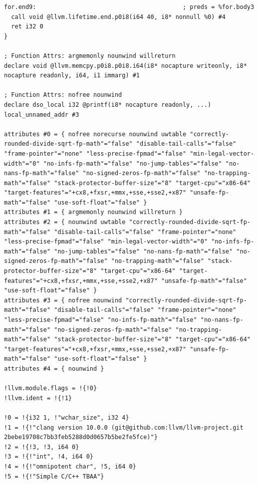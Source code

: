 \documentclass[12pt]{article}
\begin{document}
\begin{itemize}
\begin{lstlisting}[style=CStyle]
for.end9:                                         ; preds = %for.body3
  call void @llvm.lifetime.end.p0i8(i64 40, i8* nonnull %0) #4
  ret i32 0
}

; Function Attrs: argmemonly nounwind willreturn
declare void @llvm.memcpy.p0i8.p0i8.i64(i8* nocapture writeonly, i8* nocapture readonly, i64, i1 immarg) #1

; Function Attrs: nofree nounwind
declare dso_local i32 @printf(i8* nocapture readonly, ...) local_unnamed_addr #3

attributes #0 = { nofree norecurse nounwind uwtable "correctly-rounded-divide-sqrt-fp-math"="false" "disable-tail-calls"="false" "frame-pointer"="none" "less-precise-fpmad"="false" "min-legal-vector-width"="0" "no-infs-fp-math"="false" "no-jump-tables"="false" "no-nans-fp-math"="false" "no-signed-zeros-fp-math"="false" "no-trapping-math"="false" "stack-protector-buffer-size"="8" "target-cpu"="x86-64" "target-features"="+cx8,+fxsr,+mmx,+sse,+sse2,+x87" "unsafe-fp-math"="false" "use-soft-float"="false" }
attributes #1 = { argmemonly nounwind willreturn }
attributes #2 = { nounwind uwtable "correctly-rounded-divide-sqrt-fp-math"="false" "disable-tail-calls"="false" "frame-pointer"="none" "less-precise-fpmad"="false" "min-legal-vector-width"="0" "no-infs-fp-math"="false" "no-jump-tables"="false" "no-nans-fp-math"="false" "no-signed-zeros-fp-math"="false" "no-trapping-math"="false" "stack-protector-buffer-size"="8" "target-cpu"="x86-64" "target-features"="+cx8,+fxsr,+mmx,+sse,+sse2,+x87" "unsafe-fp-math"="false" "use-soft-float"="false" }
attributes #3 = { nofree nounwind "correctly-rounded-divide-sqrt-fp-math"="false" "disable-tail-calls"="false" "frame-pointer"="none" "less-precise-fpmad"="false" "no-infs-fp-math"="false" "no-nans-fp-math"="false" "no-signed-zeros-fp-math"="false" "no-trapping-math"="false" "stack-protector-buffer-size"="8" "target-cpu"="x86-64" "target-features"="+cx8,+fxsr,+mmx,+sse,+sse2,+x87" "unsafe-fp-math"="false" "use-soft-float"="false" }
attributes #4 = { nounwind }

!llvm.module.flags = !{!0}
!llvm.ident = !{!1}

!0 = !{i32 1, !"wchar_size", i32 4}
!1 = !{!"clang version 10.0.0 (git@github.com:llvm/llvm-project.git 2bebe19708c7bb3feb5288d0d0657b5be2fe5fce)"}
!2 = !{!3, !3, i64 0}
!3 = !{!"int", !4, i64 0}
!4 = !{!"omnipotent char", !5, i64 0}
!5 = !{!"Simple C/C++ TBAA"}
\end{lstlisting}
\end{itemize}
\end{document}
